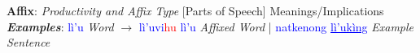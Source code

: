 \textbf{Affix}: \textit{Productivity and Affix Type} [Parts of Speech] Meanings/Implications \textit{\textbf{Examples}}: \textcolor{Blue}{lì'u}\textit{ Word} $\rightarrow$ \textcolor{Blue}{lì'uvi}\textcolor{Red}{hu }\textcolor{Blue}{lì'u}\textit{ Affixed Word} | \textcolor{Blue}{natkenong \underline{lì'ukìng}}\textit{ Example Sentence}\par